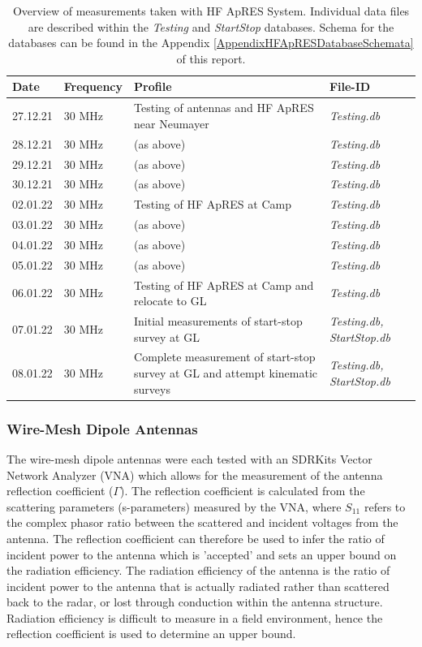 \documentclass[a4paper,12pt]{article}
\begin{document}
\begin{table}
  \begin{tabular}{m{1.5cm} m{2.25cm} m{7cm} >{\raggedright\arraybackslash}m{3cm}}
    \rowcolor{gray!50}
    Date & Frequency & Profile & File-ID\\
    \hline
    27.12.21 & 30 MHz & Testing of antennas and HF ApRES near Neumayer & \textit{Testing.db} \\
    28.12.21 & 30 MHz & (as above) & \textit{Testing.db} \\
    29.12.21 & 30 MHz & (as above) & \textit{Testing.db} \\
    30.12.21 & 30 MHz & (as above) & \textit{Testing.db} \\
    02.01.22 & 30 MHz & Testing of HF ApRES at Camp & \textit{Testing.db} \\
    03.01.22 & 30 MHz & (as above) & \textit{Testing.db} \\
    04.01.22 & 30 MHz & (as above) & \textit{Testing.db} \\
    05.01.22 & 30 MHz & (as above) & \textit{Testing.db} \\
    06.01.22 & 30 MHz & Testing of HF ApRES at Camp and relocate to GL & \textit{Testing.db} \\
    07.01.22 & 30 MHz & Initial measurements of start-stop survey at GL & \textit{Testing.db, StartStop.db} \\
    08.01.22 & 30 MHz & Complete measurement of start-stop survey at GL and attempt kinematic surveys & \textit{Testing.db, StartStop.db} \\
    \hline
  \end{tabular}
  \label{TableHFApRES}
  \caption{Overview of measurements taken with HF ApRES System.  Individual data
  files are described within the \textit{Testing} and \textit{StartStop}
  databases.  Schema for the databases can be found in the Appendix
  \ref{AppendixHFApRESDatabaseSchemata} of this report.} 
\end{table}

\subsubsection*{Wire-Mesh Dipole Antennas}
The wire-mesh dipole antennas were each tested with an SDRKits Vector Network
Analyzer (VNA) which allows for the measurement of the antenna reflection
coefficient ($\Gamma$).  The reflection coefficient is calculated from the
scattering parameters (s-parameters) measured by the VNA, where $S_{11}$ 
refers to the complex phasor ratio between the scattered and incident voltages from
the antenna.  The reflection coefficient can therefore be used to infer the 
ratio of incident power to the antenna which is 'accepted' and sets an upper
bound on the radiation efficiency.  The radiation efficiency of the antenna
is the ratio of incident power to the antenna that is actually radiated
rather than scattered back to the radar, or lost through conduction within the
antenna structure.  Radiation efficiency is difficult to measure in a field 
environment, hence the reflection coefficient is used to determine an upper
bound.
\end{document}
